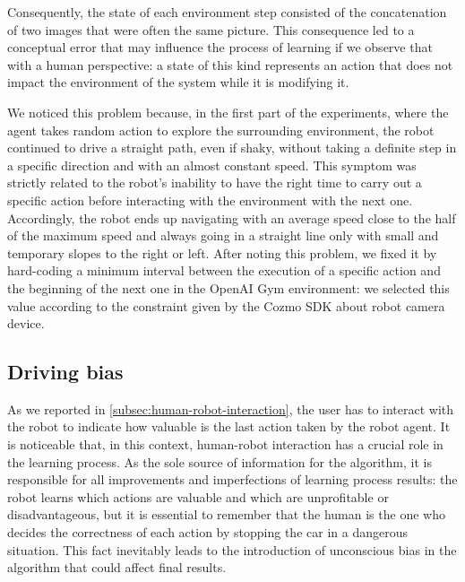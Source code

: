 Consequently, the state of each environment step consisted of the concatenation of two images that were often the same picture.
This consequence led to a conceptual error that may influence the process of learning if we observe that with a human perspective: a state of this kind represents an action that does not impact the environment of the system while it is modifying it.

We noticed this problem because, in the first part of the experiments, where the agent takes random action to explore the surrounding environment, the robot continued to drive a straight path, even if shaky, without taking a definite step in a specific direction and with an almost constant speed.
This symptom was strictly related to the robot's inability to have the right time to carry out a specific action before interacting with the environment with the next one.
Accordingly, the robot ends up navigating with an average speed close to the half of the maximum speed and always going in a straight line only with small and temporary slopes to the right or left.
After noting this problem, we fixed it by hard-coding a minimum interval between the execution of a specific action and the beginning of the next one in the OpenAI Gym environment: we selected this value according to the constraint given by the Cozmo SDK about robot camera device.

\subsection{Driving bias}

As we reported in \vref{subsec:human-robot-interaction}, the user has to interact with the robot to indicate how valuable is the last action taken by the robot agent.
It is noticeable that, in this context, human-robot interaction has a crucial role in the learning process.
As the sole source of information for the algorithm, it is responsible for all improvements and imperfections of learning process results: the robot learns which actions are valuable and which are unprofitable or disadvantageous, but it is essential to remember that the human is the one who decides the correctness of each action by stopping the car in a dangerous situation.
This fact inevitably leads to the introduction of unconscious bias in the algorithm that could affect final results.

